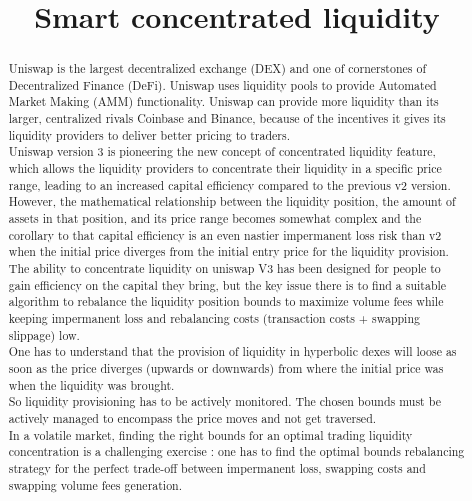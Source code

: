 \documentclass[conference]{IEEEtran}
\begin{document}
\title{Smart concentrated liquidity}

\author{
}

\maketitle

\begin{abstract}
Uniswap is the largest decentralized exchange (DEX) and one of cornerstones of Decentralized Finance (DeFi). Uniswap uses liquidity pools to provide Automated Market Making (AMM) functionality. Uniswap can provide more liquidity than its larger, centralized rivals Coinbase and Binance, because of the incentives it gives its liquidity providers to deliver better pricing to traders.\\
Uniswap version 3 is pioneering the new concept of concentrated liquidity feature, which allows the liquidity providers to concentrate their liquidity in a specific price range, leading to an increased capital efficiency compared to the previous v2 version.\\
However, the mathematical relationship between the liquidity position, the amount of assets in that position, and its price range becomes somewhat complex and the corollary to that capital efficiency is an even nastier impermanent loss risk than v2 when the initial price diverges from the initial entry price for the liquidity provision.\\
The ability to concentrate liquidity on uniswap V3 has been designed for people to gain efficiency on the capital they bring, but the key issue there is to find a suitable algorithm to rebalance the liquidity position bounds to maximize volume fees while keeping impermanent loss and rebalancing costs (transaction costs + swapping slippage) low.\\
One has to understand that the provision of liquidity in hyperbolic dexes will loose as soon as the price diverges (upwards or downwards) from where the initial price was when the liquidity was brought.\\
So liquidity provisioning has to be actively monitored. The chosen bounds must be actively managed to encompass the price moves and not get traversed.\\
In a volatile market, finding the right bounds for an optimal trading liquidity concentration is a challenging exercise : one has to find the optimal bounds rebalancing strategy for the perfect trade-off between impermanent loss, swapping costs and swapping volume fees generation.\\

\end{abstract}
\end{document}
